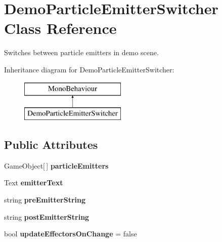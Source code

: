 \hypertarget{class_demo_particle_emitter_switcher}{}\section{Demo\+Particle\+Emitter\+Switcher Class Reference}
\label{class_demo_particle_emitter_switcher}


Switches between particle emitters in demo scene.  


Inheritance diagram for Demo\+Particle\+Emitter\+Switcher\+:\begin{figure}[H]
\begin{center}
\leavevmode
\includegraphics[height=2.000000cm]{class_demo_particle_emitter_switcher}
\end{center}
\end{figure}
\subsection*{Public Attributes}
\begin{DoxyCompactItemize}
\item 
\hypertarget{class_demo_particle_emitter_switcher_aaf0a3b5a20f6f79088d6d616aa09e0d7}{}Game\+Object\mbox{[}$\,$\mbox{]} {\bfseries particle\+Emitters}\label{class_demo_particle_emitter_switcher_aaf0a3b5a20f6f79088d6d616aa09e0d7}

\item 
\hypertarget{class_demo_particle_emitter_switcher_afb968986e985f571061aaf8b0838f0cd}{}Text {\bfseries emitter\+Text}\label{class_demo_particle_emitter_switcher_afb968986e985f571061aaf8b0838f0cd}

\item 
\hypertarget{class_demo_particle_emitter_switcher_a6f166dc96014592c56138d79dee4a740}{}string {\bfseries pre\+Emitter\+String}\label{class_demo_particle_emitter_switcher_a6f166dc96014592c56138d79dee4a740}

\item 
\hypertarget{class_demo_particle_emitter_switcher_ab8841c0c04141643617ed9dd3de8a3f6}{}string {\bfseries post\+Emitter\+String}\label{class_demo_particle_emitter_switcher_ab8841c0c04141643617ed9dd3de8a3f6}

\item 
\hypertarget{class_demo_particle_emitter_switcher_ac76a51e97ff6db549a765ef17c7cfac0}{}bool {\bfseries update\+Effectors\+On\+Change} = false\label{class_demo_particle_emitter_switcher_ac76a51e97ff6db549a765ef17c7cfac0}

\end{DoxyCompactItemize}


